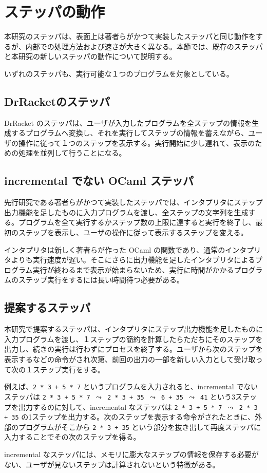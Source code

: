 \section{ステッパの動作}

本研究のステッパは、表面上は著者らがかつて実装したステッパ\cite{FCA19}と同じ動作をするが、内部での処理方法および速さが大きく異なる。本節では、既存のステッパと本研究の新しいステッパの動作について説明する。

いずれのステッパも、実行可能な１つのプログラムを対象としている。

\subsection{DrRacketのステッパ}
\label{ステッパの動作-DrRacketのステッパ}
DrRacket のステッパ\cite{clements01}は、ユーザが入力したプログラムを全ステップの情報を生成するプログラムへ変換し、それを実行してステップの情報を蓄えながら、ユーザの操作に従って１つのステップを表示する。実行開始に少し遅れて、表示のための処理を並列して行うことになる。

\subsection{incremental でない OCaml ステッパ}
\label{ステッパの動作-incrementalでないOCamlステッパ}
先行研究である著者らがかつて実装したステッパ\cite{FCA19}では、インタプリタにステップ出力機能を足したものに入力プログラムを渡し、全ステップの文字列を生成する。プログラムを全て実行するかステップ数の上限に達すると実行を終了し、最初のステップを表示し、ユーザの操作に従って表示するステップを変える。

インタプリタは新しく著者らが作った OCaml の関数であり、通常のインタプリタよりも実行速度が遅い。そこにさらに出力機能を足したインタプリタによるプログラム実行が終わるまで表示が始まらないため、実行に時間がかかるプログラムのステップ実行をするには長い時間待つ必要がある。

\subsection{提案するステッパ}
\label{ステッパの動作-提案するステッパ}

本研究で提案するステッパは、インタプリタにステップ出力機能を足したものに入力プログラムを渡し、１ステップの簡約を計算したらただちにそのステップを出力し、続きの実行は行わずにプロセスを終了する。ユーザから次のステップを表示するなどの命令がされ次第、前回の出力の一部を新しい入力として受け取って次の１ステップ実行をする。

例えば、\texttt{2 * 3 + 5 * 7} というプログラムを入力されると、incremental でないステッパは \texttt{2 * 3 + 5 * 7 $\leadsto$ 2 * 3 + 35 $\leadsto$ 6 + 35 $\leadsto$ 41} という3ステップを出力するのに対して、incremental なステッパは \texttt{2 * 3 + 5 * 7 $\leadsto$ 2 * 3 + 35} の1ステップを出力する。次のステップを表示する命令がされたときに、外部のプログラムがそこから \texttt{2 * 3 + 35} という部分を抜き出して再度ステッパに入力することでその次のステップを得る。

incremental なステッパには、メモリに膨大なステップの情報を保存する必要がない、ユーザが見ないステップは計算されないという特徴がある。

